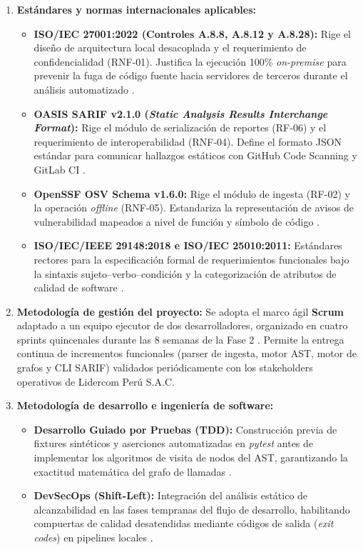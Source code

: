 \begin{enumerate}[leftmargin=1.27cm, label=\alph*)]
    \item \textbf{Estándares y normas internacionales aplicables:}
    \begin{itemize}
        \item \textbf{ISO/IEC 27001:2022 (Controles A.8.8, A.8.12 y A.8.28):} Rige el diseño de arquitectura local desacoplada y el requerimiento de confidencialidad (RNF-01). Justifica la ejecución 100\% \textit{on-premise} para prevenir la fuga de código fuente hacia servidores de terceros durante el análisis automatizado \parencite{ladisa2023sok, gutierrez2024auditoria}. %
        \item \textbf{OASIS SARIF v2.1.0 (\textit{Static Analysis Results Interchange Format}):} Rige el módulo de serialización de reportes (RF-06) y el requerimiento de interoperabilidad (RNF-04). Define el formato JSON estándar para comunicar hallazgos estáticos con GitHub Code Scanning y GitLab CI \parencite{oasis2019sarif}. %
        \item \textbf{OpenSSF OSV Schema v1.6.0:} Rige el módulo de ingesta (RF-02) y la operación \textit{offline} (RNF-05). Estandariza la representación de avisos de vulnerabilidad mapeados a nivel de función y símbolo de código \parencite{openssf2023osv}. %
        \item \textbf{ISO/IEC/IEEE 29148:2018 e ISO/IEC 25010:2011:} Estándares rectores para la especificación formal de requerimientos funcionales bajo la sintaxis sujeto--verbo--condición y la categorización de atributos de calidad de software \parencite{iso2018req, iso2011sqa, wiegers2013software}. %
    \end{itemize}

    \item \textbf{Metodología de gestión del proyecto:}
    Se adopta el marco ágil \textbf{Scrum} adaptado a un equipo ejecutor de dos desarrolladores, organizado en cuatro sprints quincenales durante las 8 semanas de la Fase 2 \parencite{pmi2021pmbok, torres2026proyecto}. %
    Permite la entrega continua de incrementos funcionales (parser de ingesta, motor AST, motor de grafos y CLI SARIF) validados periódicamente con los stakeholders operativos de Lidercom Perú S.A.C.

    \item \textbf{Metodología de desarrollo e ingeniería de software:}
    \begin{itemize}
        \item \textbf{Desarrollo Guiado por Pruebas (TDD):} Construcción previa de fixtures sintéticos y aserciones automatizadas en \textit{pytest} antes de implementar los algoritmos de visita de nodos del AST, garantizando la exactitud matemática del grafo de llamadas \parencite{myers2011art}. %
        \item \textbf{DevSecOps (Shift-Left):} Integración del análisis estático de alcanzabilidad en las fases tempranas del flujo de desarrollo, habilitando compuertas de calidad desatendidas mediante códigos de salida (\textit{exit codes}) en pipelines locales \parencite{humble2010continuous}. %
    \end{itemize}


\end{enumerate}
